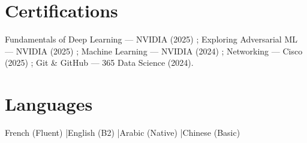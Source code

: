 \documentclass[a4paper,8.5pt]{article}
\begin{document}
\section{Certifications}
Fundamentals of Deep Learning --- NVIDIA (2025) ; Exploring Adversarial ML --- NVIDIA (2025) ; Machine Learning --- NVIDIA (2024) ; Networking --- Cisco (2025) ; Git \& GitHub --- 365 Data Science (2024).
\section{Languages}
French (Fluent) \quad|\quad English (B2) \quad|\quad Arabic (Native) \quad|\quad Chinese (Basic)
\end{document}
